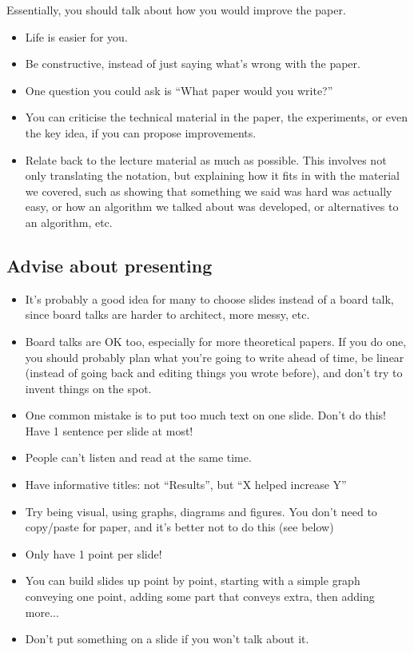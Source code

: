 \documentclass[twoside]{article}
\begin{document}
Essentially, you should talk about how you would improve the paper.

\begin{itemize}
\item Life is easier for you.
\item Be constructive, instead of just saying what's wrong with the paper.
\item One question you could ask is ``What paper would you write?''
\item You can criticise the technical material in the paper, the experiments, or even the key idea, if you can propose improvements.
  \item Relate back to the lecture material as much as possible. This involves not only translating the notation, but explaining how it fits in with the material we covered, such as showing that something we said was hard was actually easy, or how an algorithm we talked about was developed, or alternatives to an algorithm, etc.
\end{itemize}

\subsection{Advise about presenting}
\label{sec:advise-about-pres}

\begin{itemize}
\item It's probably a good idea for many to choose slides instead of a board talk, since board talks are harder to architect, more messy, etc.
\item Board talks are OK too, especially for more theoretical papers. If you do one, you should probably plan what you're going to write ahead of time, be linear (instead of going back and editing things you wrote before), and don't try to invent things on the spot.
\item One common mistake is to put too much text on one slide. Don't do this! Have 1 sentence per slide at most!
\item People can't listen and read at the same time.
\item Have informative titles: not ``Results'', but ``X helped increase Y''
\item Try being visual, using graphs, diagrams and figures. You don't need to copy/paste for paper, and it's better not to do this (see below)
\item Only have 1 point per slide!
\item You can build slides up point by point, starting with a simple graph conveying one point, adding some part that conveys extra, then adding more...
\item Don't put something on a slide if you won't talk about it.
\end{itemize}
\end{document}
